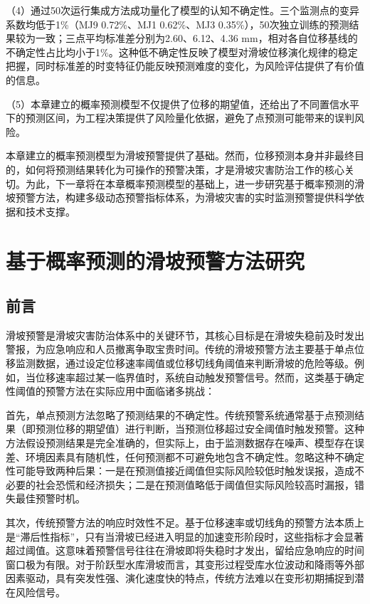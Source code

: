 \documentclass[12pt,a4paper]{article}
\begin{document}
（4）通过50次运行集成方法成功量化了模型的认知不确定性。三个监测点的变异系数均低于1\%（MJ9 0.72\%、MJ1 0.62\%、MJ3 0.35\%），50次独立训练的预测结果较为一致；三点平均标准差分别为2.60、6.12、4.36 mm，相对各自位移基线的不确定性占比均小于1\%。这种低不确定性反映了模型对滑坡位移演化规律的稳定把握，同时标准差的时变特征仍能反映预测难度的变化，为风险评估提供了有价值的信息。

（5）本章建立的概率预测模型不仅提供了位移的期望值，还给出了不同置信水平下的预测区间，为工程决策提供了风险量化依据，避免了点预测可能带来的误判风险。

本章建立的概率预测模型为滑坡预警提供了基础。然而，位移预测本身并非最终目的，如何将预测结果转化为可操作的预警决策，才是滑坡灾害防治工作的核心关切。为此，下一章将在本章概率预测模型的基础上，进一步研究基于概率预测的滑坡预警方法，构建多级动态预警指标体系，为滑坡灾害的实时监测预警提供科学依据和技术支撑。


\section{基于概率预测的滑坡预警方法研究}

\subsection{前言}

滑坡预警是滑坡灾害防治体系中的关键环节，其核心目标是在滑坡失稳前及时发出警报，为应急响应和人员撤离争取宝贵时间。传统的滑坡预警方法主要基于单点位移监测数据，通过设定位移速率阈值或位移切线角阈值来判断滑坡的危险等级。例如，当位移速率超过某一临界值时，系统自动触发预警信号。然而，这类基于确定性阈值的预警方法在实际应用中面临诸多挑战：

首先，单点预测方法忽略了预测结果的不确定性。传统预警系统通常基于点预测结果（即预测位移的期望值）进行判断，当预测位移超过安全阈值时触发预警。这种方法假设预测结果是完全准确的，但实际上，由于监测数据存在噪声、模型存在误差、环境因素具有随机性，任何预测都不可避免地包含不确定性。忽略这种不确定性可能导致两种后果：一是在预测值接近阈值但实际风险较低时触发误报，造成不必要的社会恐慌和经济损失；二是在预测值略低于阈值但实际风险较高时漏报，错失最佳预警时机。

其次，传统预警方法的响应时效性不足。基于位移速率或切线角的预警方法本质上是“滞后性指标”，只有当滑坡已经进入明显的加速变形阶段时，这些指标才会显著超过阈值。这意味着预警信号往往在滑坡即将失稳时才发出，留给应急响应的时间窗口极为有限。对于阶跃型水库滑坡而言，其变形过程受库水位波动和降雨等外部因素驱动，具有突发性强、演化速度快的特点，传统方法难以在变形初期捕捉到潜在风险信号。
\end{document}
